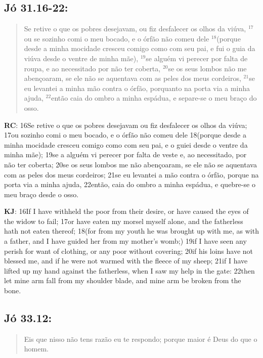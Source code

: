 \subsection*{Jó 31.16-22:} 
 \begin{quote}
    \small
Se retive o que os pobres desejavam, ou fiz desfalecer os olhos da viúva, $^{\mathrm{17}}$ou se\uwave{,} sozinho comi o meu bocado, e o órfão não comeu dele $^{\mathrm{18}}$(porque desde a minha mocidade cresceu comigo como com seu pai, e fui o guia da viúva desde o ventre de minha mãe), $^{\mathrm{19}}$se alguém vi perecer por falta de roupa, e ao necessitado por não ter coberta, $^{\mathrm{20}}$se os seus lombos não me abençoaram, se ele não se aquentava com as peles dos meus cordeiros, $^{\mathrm{21}}$se eu levantei a minha mão contra o órfão, porquanto na porta via a minha ajuda, $^{\mathrm{22}}$então caia do ombro a minha espádua, e separe-se o meu braço do osso.
\end{quote}

\textbf{RC}: 16Se retive o que os pobres desejavam ou fiz desfalecer os olhos da viúva; 17ou sozinho comi o meu bocado, e o órfão não comeu dele 18(porque desde a minha mocidade cresceu comigo como com seu pai, e o guiei desde o ventre da minha mãe); 19se a alguém vi perecer por falta de veste e, ao necessitado, por não ter coberta; 20se os seus lombos me não abençoaram, se ele não se aquentava com as peles dos meus cordeiros; 21se eu levantei a mão contra o órfão, porque na porta via a minha ajuda, 22então, caia do ombro a minha espádua, e quebre-se o meu braço desde o osso.

\textbf{KJ}: 16If I have withheld the poor from their desire, or have caused the eyes of the widow to fail; 17or have eaten my morsel myself alone, and the fatherless hath not eaten thereof; 18(for from my youth he was brought up with me, as with a father, and I have guided her from my mother’s womb;) 19if I have seen any perish for want of clothing, or any poor without covering; 20if his loins have not blessed me, and if he were not warmed with the fleece of my sheep; 21if I have lifted up my hand against the fatherless, when I saw my help in the gate: 22then let mine arm fall from my shoulder blade, and mine arm be broken from the bone.

\subsection*{Jó 33.12:} 
 \begin{quote}
    \small
Eis que nisso não tens razão\uwave{;} eu te respondo; porque maior é Deus do que o homem.
\end{quote}

